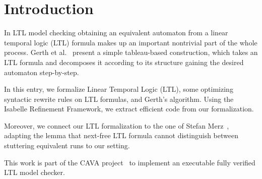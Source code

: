 \section{Introduction}
In LTL model checking obtaining an equivalent automaton from a linear temporal logic (LTL) formula makes up an important nontrivial part of the whole process.
Gerth et al.~\cite{Gerth1995} present a simple tableau-based construction, which takes an LTL formula and decomposes it according to its
structure gaining the desired automaton step-by-step.

In this entry, we formalize Linear Temporal Logic (LTL), some optimizing syntactic rewrite rules on LTL formulas, and
Gerth's algorithm.
Using the Isabelle Refinement Framework, we extract efficient code from our formalization.

Moreover, we connect our LTL formalization to the one of Stefan Merz~\cite{Merz12}, adapting the lemma that
next-free LTL formula cannot distinguish between stuttering equivalent runs to our setting.

This work is part of the CAVA project~\cite{VeriLTLMC13} to implement an executable fully verified LTL model checker.
